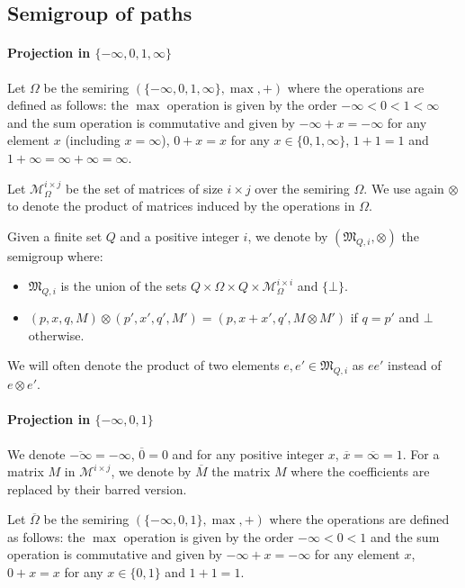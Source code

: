 \documentclass{lmcs}
\theoremstyle{remark}
\newcommand{\matrices}[2]{\mathcal{M}^{#1 \times #2}}
\newcommand{\matricesOm}[2]{\mathcal{M}^{#1 \times #2}_\Omega}
\newcommand{\ideal}{\mathfrak{M}}
\theoremstyle{remark}
\begin{document}
\subsection{Semigroup of paths}
\label{sec:semi-group-of-paths}
\paragraph*{Projection in $\{-\infty,0,1,\infty\}$}

Let $\Omega$ be the semiring $\left(\{-\infty,0,1,\infty\}, \max, +\right)$ where the operations are defined as follows: the $\max$ operation is given by the order $-\infty < 0 < 1 < \infty$ and the sum operation is commutative and given by $-\infty + x = -\infty$ for any element $x$ (including $x=\infty$), $0 + x = x$ for any $x \in \{0,1, \infty\}$, $1 + 1 = 1$ and $1 + \infty = \infty + \infty = \infty$.

Let $\matricesOm{i}{j}$ be the set of matrices of size $i \times j$ over the semiring $\Omega$. We use again $\otimes$ to denote the product of matrices induced by the operations in $\Omega$.

Given a finite set $Q$ and a positive integer $i$, we denote by $(\ideal_{Q,i}, \otimes)$ the semigroup where:
\begin{itemize}
\item $\ideal_{Q,i}$ is the union of the sets $Q \times \Omega \times Q \times \matricesOm{i}{i}$ and $\{\bot\}$.
\item $(p,x,q,M)\otimes(p',x',q',M') = (p,x + x',q', M\otimes M')$ if $q = p'$ and $\bot$ otherwise.
\end{itemize}

We will often denote the product of two elements $e,e'\in\ideal_{Q,i}$ as $ee'$ instead of $e\otimes e'$.

\paragraph*{Projection in $\{-\infty,0,1\}$}

We denote $\overline{-\infty}= -\infty$, $\overline{0}= 0$ and for any positive integer $x$, $\overline{x}= \overline{\infty} = 1$. For a matrix $M$ in $\matrices{i}{j}$, we denote by $\overline{M}$ the matrix $M$ where the coefficients are replaced by their barred version.

Let $\overline{\Omega}$ be the semiring $\left(\{-\infty,0,1\}, \max, +\right)$ where the operations are defined as follows: the $\max$ operation is given by the order $-\infty < 0 < 1 $ and the sum operation is commutative and given by $-\infty + x = -\infty$ for any element $x$, $0 + x = x$ for any $x \in \{0,1\}$ and $1 + 1 = 1$.
\end{document}
